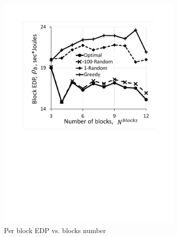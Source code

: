 \begin{figure}
    \centering
     \begin{subfigure}{0.4\textwidth}
        \includegraphics[width=\linewidth]{figs/BlockEDPVsBlocks.pdf}
        \caption{Per block EDP vs. blocks number}
        \label{fig:BlockEDPVsBlocks}
    \end{subfigure}
    \hspace{12mm}
     \begin{subfigure}{0.4\textwidth}

\end{subfigure}
\end{figure}
